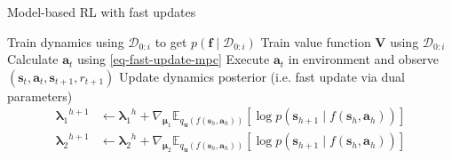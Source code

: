 \documentclass{article}
\newcommand{\state}{\ensuremath{\mathbf{s}}}
\newcommand{\action}{\ensuremath{\mathbf{a}}}
\newcommand{\inducingVariable}{\ensuremath{\mathbf{u}}}
\newcommand{\dataset}{\ensuremath{\mathcal{D}}}
\newcommand{\dualParam}[1]{\ensuremath{\bm{\lambda}_{#1}}}
\newcommand{\meanParam}[1]{\ensuremath{\bm{\mu}_{#1}}}
\newcommand{\horizon}{\ensuremath{h}}
\newcommand{\transitionFn}{\ensuremath{f}}
\newcommand{\latentFn}{\ensuremath{f}}
\newcommand{\stateValueFn}{\ensuremath{\mathbf{V}}}
\begin{document}
\begin{algorithm}[!t]
\caption{Model-based RL with fast updates}\label{alg-mbrl-with-fast-updates}
\begin{algorithmic}[1]
    \State Train dynamics using $\dataset_{0:i}$ to get $p(\mathbf{\transitionFn} \mid \dataset_{0:i})$
    \State Train value function $\stateValueFn$ using $\dataset_{0:i}$
      \State Calculate $\action_{t}$ using \cref{eq-fast-update-mpc}
      \State Execute $\action_{t}$ in environment and observe $(\state_{t}, \action_{t}, \state_{t+1}, r_{t+1})$
      \State Update dynamics posterior (i.e. fast update via dual parameters)
      \begin{align}
      \dualParam{1}^{\horizon+1} &\leftarrow \dualParam{1}^{\horizon} +  \nabla_{\meanParam{1}} \mathbb{E}_{q_{\inducingVariable}(\latentFn(\state_{\horizon}, \action_{\horizon}))} \left[ \log p(\state_{\horizon+1} \mid \latentFn(\state_{\horizon}, \action_{\horizon}) ) \right] \\
      \dualParam{2}^{\horizon+1} &\leftarrow \dualParam{2}^{\horizon} +  \nabla_{\meanParam{2}} \mathbb{E}_{q_{\inducingVariable}(\latentFn(\state_{\horizon}, \action_{\horizon}))}  \left[ \log p(\state_{\horizon+1} \mid \latentFn(\state_{\horizon}, \action_{\horizon}) ) \right]
      \end{align}
    \EndFor
\EndFor
\end{algorithmic}
\end{algorithm}
\end{document}
